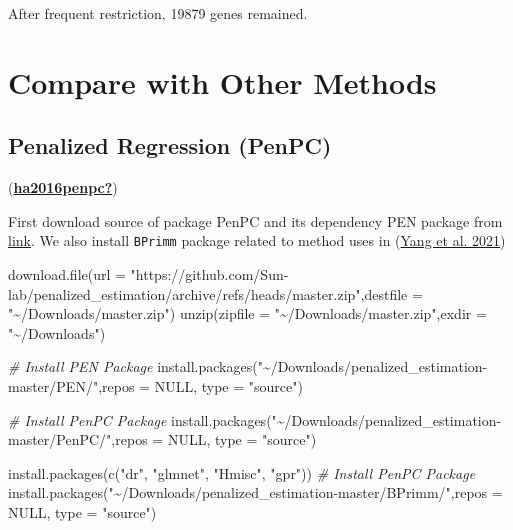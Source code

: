 \documentclass[
]{book}
\newenvironment{Shaded}{\begin{snugshade}}{\end{snugshade}}
\newcommand{\AttributeTok}[1]{\textcolor[rgb]{0.77,0.63,0.00}{#1}}
\newcommand{\CommentTok}[1]{\textcolor[rgb]{0.56,0.35,0.01}{\textit{#1}}}
\newcommand{\ConstantTok}[1]{\textcolor[rgb]{0.00,0.00,0.00}{#1}}
\newcommand{\FunctionTok}[1]{\textcolor[rgb]{0.00,0.00,0.00}{#1}}
\newcommand{\NormalTok}[1]{#1}
\newcommand{\StringTok}[1]{\textcolor[rgb]{0.31,0.60,0.02}{#1}}
\begin{document}
After frequent restriction, 19879 genes remained.

\hypertarget{compare-with-other-methods}{%
\section{Compare with Other Methods}\label{compare-with-other-methods}}

\hypertarget{penalized-regression-penpc}{%
\subsection{Penalized Regression (PenPC)}\label{penalized-regression-penpc}}

(\protect\hyperlink{ref-ha2016penpc}{\textbf{ha2016penpc?}})

First download source of package PenPC and its dependency PEN package from \href{https://github.com/Sun-lab/penalized_estimation}{link}.
We also install \texttt{BPrimm} package related to method uses in (\protect\hyperlink{ref-yang2021model}{Yang et al. 2021})

\begin{Shaded}
\begin{Highlighting}[]

\FunctionTok{download.file}\NormalTok{(}\AttributeTok{url =} \StringTok{"https://github.com/Sun{-}lab/penalized\_estimation/archive/refs/heads/master.zip"}\NormalTok{,}\AttributeTok{destfile =} \StringTok{"\textasciitilde{}/Downloads/master.zip"}\NormalTok{)}
\FunctionTok{unzip}\NormalTok{(}\AttributeTok{zipfile =} \StringTok{"\textasciitilde{}/Downloads/master.zip"}\NormalTok{,}\AttributeTok{exdir =} \StringTok{"\textasciitilde{}/Downloads"}\NormalTok{)}

\CommentTok{\# Install PEN Package}
\FunctionTok{install.packages}\NormalTok{(}\StringTok{"\textasciitilde{}/Downloads/penalized\_estimation{-}master/PEN/"}\NormalTok{,}\AttributeTok{repos =} \ConstantTok{NULL}\NormalTok{, }\AttributeTok{type =} \StringTok{"source"}\NormalTok{)}

\CommentTok{\# Install PenPC Package}
\FunctionTok{install.packages}\NormalTok{(}\StringTok{"\textasciitilde{}/Downloads/penalized\_estimation{-}master/PenPC/"}\NormalTok{,}\AttributeTok{repos =} \ConstantTok{NULL}\NormalTok{, }\AttributeTok{type =} \StringTok{"source"}\NormalTok{)}

\FunctionTok{install.packages}\NormalTok{(}\FunctionTok{c}\NormalTok{(}\StringTok{"dr"}\NormalTok{, }\StringTok{"glmnet"}\NormalTok{, }\StringTok{"Hmisc"}\NormalTok{, }\StringTok{"gpr"}\NormalTok{))}
\CommentTok{\# Install PenPC Package}
\FunctionTok{install.packages}\NormalTok{(}\StringTok{"\textasciitilde{}/Downloads/penalized\_estimation{-}master/BPrimm/"}\NormalTok{,}\AttributeTok{repos =} \ConstantTok{NULL}\NormalTok{, }\AttributeTok{type =} \StringTok{"source"}\NormalTok{)}
\end{Highlighting}
\end{Shaded}
\end{document}
